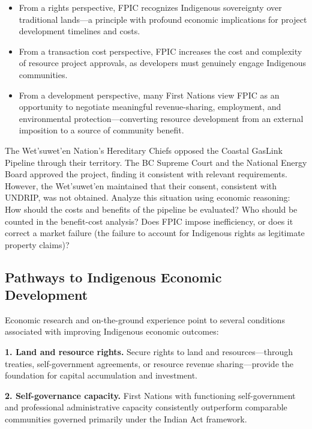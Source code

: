 \begin{itemize}
  \item From a rights perspective, FPIC recognizes Indigenous sovereignty over traditional lands---a principle with profound economic implications for project development timelines and costs.
  \item From a transaction cost perspective, FPIC increases the cost and complexity of resource project approvals, as developers must genuinely engage Indigenous communities.
  \item From a development perspective, many First Nations view FPIC as an opportunity to negotiate meaningful revenue-sharing, employment, and environmental protection---converting resource development from an external imposition to a source of community benefit.
\end{itemize}

\begin{thinkbox}
The Wet'suwet'en Nation's Hereditary Chiefs opposed the Coastal GasLink Pipeline through their territory. The BC Supreme Court and the National Energy Board approved the project, finding it consistent with relevant requirements. However, the Wet'suwet'en maintained that their consent, consistent with UNDRIP, was not obtained. Analyze this situation using economic reasoning: How should the costs and benefits of the pipeline be evaluated? Who should be counted in the benefit-cost analysis? Does FPIC impose inefficiency, or does it correct a market failure (the failure to account for Indigenous rights as legitimate property claims)?
\end{thinkbox}

\subsection{Pathways to Indigenous Economic Development}

Economic research and on-the-ground experience point to several conditions associated with improving Indigenous economic outcomes:

\textbf{1. Land and resource rights.} Secure rights to land and resources---through treaties, self-government agreements, or resource revenue sharing---provide the foundation for capital accumulation and investment.

\textbf{2. Self-governance capacity.} First Nations with functioning self-government and professional administrative capacity consistently outperform comparable communities governed primarily under the Indian Act framework.

